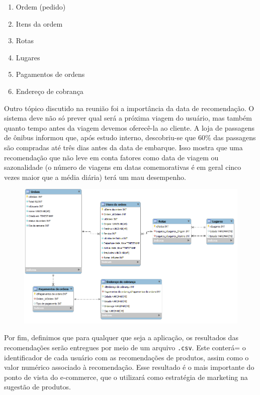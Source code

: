 \begin{enumerate}
	\item Ordem (pedido)
	\item Itens da ordem
	\item Rotas
	\item Lugares
	\item Pagamentos de ordens
	\item Endereço de cobrança
\end{enumerate}

Outro tópico discutido na reunião foi a importância da data de recomendação. O sistema deve não só prever qual será a próxima viagem do usuário, mas também quanto tempo antes da viagem devemos oferecê-la ao cliente. A loja de passagens de ônibus informou que, após estudo interno, descobriu-se que 60\% das passagens são compradas até três dias antes da data de embarque. Isso mostra que uma recomendação que não leve em conta fatores como data de viagem ou sazonalidade (o número de viagens em datas comemorativas é em geral cinco vezes maior que a média diária) terá um mau desempenho.

\begin{center}
\begin{figure}[ht]
    \begin{center}
    \includegraphics[width=1\textwidth]{img/estrutura-banco-de-dados}
    \end{center}
    \label{fig:bd-clickbus}
\end{figure}
\end{center}


Por fim, definimos que para qualquer que seja a aplicação, os resultados das recomendações serão entregues por meio de um arquivo \texttt{.csv}. Este conterá= o identificador de cada usuário com as recomendações de produtos, assim como o valor numérico associado à recomendação. Esse resultado é o mais importante do ponto de vista do e-commerce, que o utilizará como estratégia de marketing na sugestão de produtos.